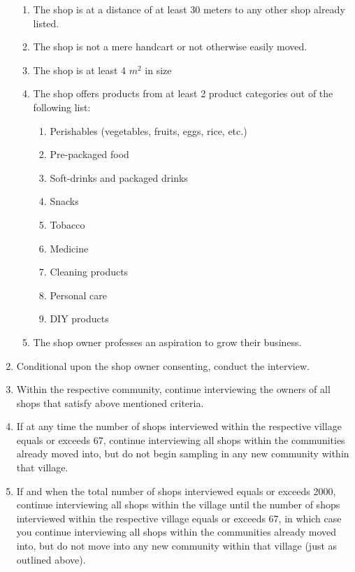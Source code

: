 \documentclass[11.5pt]{article}
\begin{document}
\begin{appendices}
\begin{enumerate}
\begin{enumerate}
		\item The shop is at a distance of at least 30 meters to any other shop 					already listed.

		\item The shop is not a mere handcart or not otherwise easily moved.

		\item The shop is at least 4 $m^2$ in size

		\item The shop offers products from at least 2 product categories out of 					the following list:

		\begin{enumerate}


			\item Perishables (vegetables, fruits, eggs, rice, etc.)
			\item Pre-packaged food
			\item Soft-drinks and packaged drinks
			\item Snacks
			\item Tobacco
			\item Medicine
			\item Cleaning products
			\item Personal care
			\item DIY products

		\end{enumerate}

		\item The shop owner professes an aspiration to grow their business.

	\end{enumerate}

	\item Conditional upon the shop owner consenting, conduct the interview.

	\item Within the respective community, continue interviewing the owners of all 				shops that satisfy above mentioned criteria.

	\item If at any time the number of shops interviewed within the respective 					village equals or exceeds 67, continue interviewing all shops within 				the communities already moved into, but do not begin sampling in any 				new community within that village.

	\item If and when the total number of shops interviewed equals or exceeds 					2000, continue interviewing all shops within the village until the 					number of shops interviewed within the respective village equals or 				exceeds 67, in which case you continue interviewing all shops within 				the communities already moved into, but do not move into any new 					community within that village (just as outlined above).


\end{enumerate}
\end{appendices}
\end{document}

